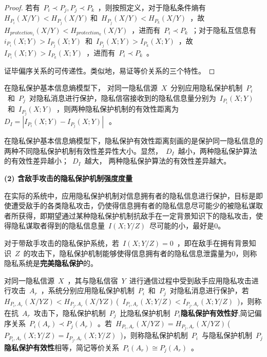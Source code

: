 \begin{proof}
	若有~$P_{i}\prec P_{j},P_{j}\prec P_{k}$~，则按照定义，对于隐私条件熵有~$H_{P_{i}}(X/Y)< H_{P_{j}}(X/Y)~$和~$H_{P_{j}}(X/Y)< H_{P_{k}}(X/Y)$~，故~$H_{protection_{i}}(X/Y)< H_{protection_{k}}(X/Y)$~，进而有~$P_{i}\prec P_{k}$~；对于隐私互信息有~$i_{P_{i}}(X;Y)>I_{P_{j}}(X;Y)$~和~$I_{P_{j}}(X;Y)>I_{P_{k}}(X;Y)$~，故~$I_{P_{i}}(X;Y)>I_{P_{k}}(X;Y)$~，进而有~$P_{i}\prec P_{k}$~。
	
	证毕偏序关系的可传递性。类似地，易证等价关系的三个特性。
\end{proof}


\begin{definition}[隐私保护有效性距离]
	\label{def:privacy-preserving-distance} 
	在隐私保护基本信息熵模型下， 对同一隐私信源~$X$~分别应用隐私保护机制~$P_{i}$~和~$P_{j}$~对隐私消息进行保护，隐私信宿接收到的隐私信息量分别为~$I_{P_{i}}(X;Y)$~和~$I_{P_{j}}(X;Y)$~，则两种隐私保护机制的有效性距离为~$D_{I}=\left | I_{P_{i}}(X;Y)-I_{P_{j}}(X;Y) \right |~$~。
\end{definition}

在隐私保护基本信息熵模型下，隐私保护有效性距离刻画的是保护同一隐私信息的两种不同隐私保护机制有效性差异性大小。显然，~$D_{I}$~越小，两种隐私保护算法的有效性差异越小；~$D_{I}$~越大， 两种隐私保护算法的有效性差异越大。

\textbf{(2) 含敌手攻击的隐私保护机制强度度量}

在实际的系统中，应用隐私保护机制对信息拥有者的隐私信息进行保护，目标是即使遭受敌手的各类隐私攻击，仍使得信息拥有者的隐私信息尽可能少的被隐私谋取者所获得，即期望通过某种隐私保护机制抗敌手在一定背景知识下的隐私攻击，使得隐私谋取者得到的隐私信息量~$I(X;Y/Z)$~尽可能的小，最好是0。

\begin{definition}
	\label{def:perfect-privacy-preserving}
	 对于带敌手攻击的隐私保护系统，若~$I(X;Y/Z)=0$~，即在敌手在拥有背景知识~$Z$~的攻击下，隐私保护机制能够使得信息拥有者的隐私信息泄露量为0，则称隐私系统是\textbf{完美隐私保护}的。
\end{definition}


\begin{definition}
	\label{def:privacy-preserving-performance}
	对同一隐私信源~$X$~，其与隐私信宿~$Y$~进行通信过程中受到敌手应用隐私攻击进行攻击~$A_{r}$~，系统分别应用隐私保护机制~$P_{i}$~和~$P_{j}$~对隐私消息进行保护，若~$H_{P_{i},A_{r}}(X/YZ)<H_{P_{j},A_{r}}(X/YZ)~$(~$I_{P_{i},A_{r}}(X;Y/Z)<I_{P_{j},A_{r}}(X;Y/Z)$~)，则称在抗~$A_{r}$~攻击下，隐私保护机制~$P_{j}$~比隐私保护机制~$P_{i}$\textbf{隐私保护有效性好},简记偏序关系~$P_{i}(A_{r})\prec P_{j}(A_{r})$~。若~$H_{P_{i},A_{r}}(X/YZ)=H_{P_{j},A_{r}}(X/YZ)~$(~$P_{P_{i},A_{r}}(X;Y/Z)=I_{P_{j},A_{r}}(X;Y/Z)$~)，则称隐私保护机制~$P_{i}$~与隐私保护机制~$P_{j}$\textbf{隐私保护有效性}相等，简记等价关系~$P_{i}(A_{r})\cong P_{j}(A_{r})$~。
\end{definition}

